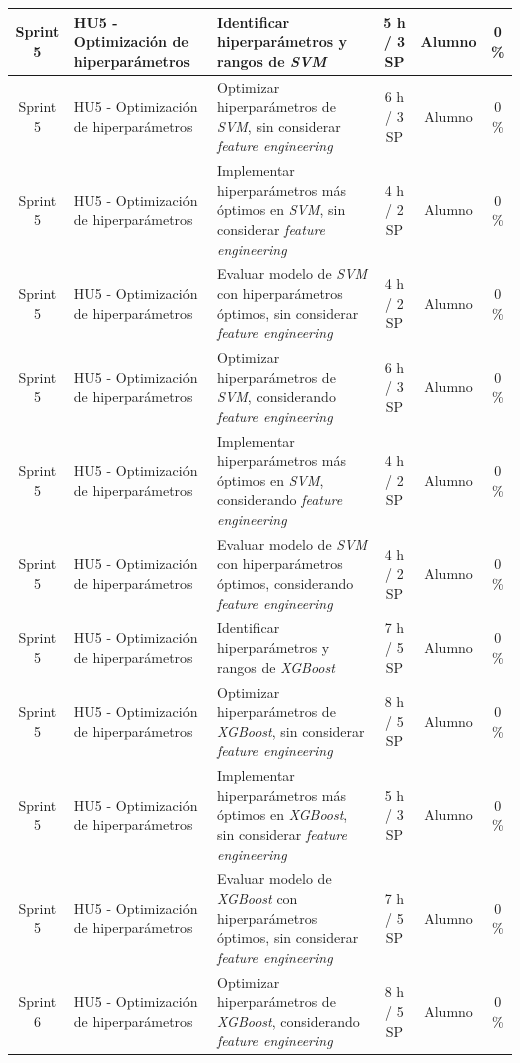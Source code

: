 \documentclass[
11pt, %
]{charter}
\begin{document}
\begin{xltabular}{\linewidth}{@{}|c|X|X|c|c|c|@{}}
Sprint 5 & HU5 - Optimización de hiperparámetros & Identificar hiperparámetros y rangos de \textit{SVM}  & 5 h / 3 SP & Alumno & 0 \% \\ \hline
Sprint 5 & HU5 - Optimización de hiperparámetros & Optimizar hiperparámetros de \textit{SVM}, sin considerar \textit{feature engineering}  & 6 h / 3 SP & Alumno & 0 \% \\ \hline
Sprint 5 & HU5 - Optimización de hiperparámetros & Implementar hiperparámetros más óptimos en \textit{SVM}, sin considerar \textit{feature engineering}  & 4 h / 2 SP & Alumno & 0 \% \\ \hline
Sprint 5 & HU5 - Optimización de hiperparámetros & Evaluar modelo de \textit{SVM} con hiperparámetros óptimos, sin considerar \textit{feature engineering}  & 4 h / 2 SP & Alumno & 0 \% \\ \hline
Sprint 5 & HU5 - Optimización de hiperparámetros & Optimizar hiperparámetros de \textit{SVM}, considerando \textit{feature engineering}  & 6 h / 3 SP & Alumno & 0 \% \\ \hline
Sprint 5 & HU5 - Optimización de hiperparámetros & Implementar hiperparámetros más óptimos en \textit{SVM}, considerando \textit{feature engineering}  & 4 h / 2 SP & Alumno & 0 \% \\ \hline
Sprint 5 & HU5 - Optimización de hiperparámetros & Evaluar modelo de \textit{SVM} con hiperparámetros óptimos, considerando \textit{feature engineering}  & 4 h / 2 SP & Alumno & 0 \% \\ \hline
Sprint 5 & HU5 - Optimización de hiperparámetros & Identificar hiperparámetros y rangos de \textit{XGBoost}  & 7 h / 5 SP & Alumno & 0 \% \\ \hline
Sprint 5 & HU5 - Optimización de hiperparámetros & Optimizar hiperparámetros de \textit{XGBoost}, sin considerar \textit{feature engineering}  & 8 h / 5 SP & Alumno & 0 \%\\ \hline
Sprint 5 & HU5 - Optimización de hiperparámetros & Implementar hiperparámetros más óptimos en \textit{XGBoost}, sin considerar \textit{feature engineering} & 5 h / 3 SP & Alumno & 0 \% \\ \hline
Sprint 5 & HU5 - Optimización de hiperparámetros & Evaluar modelo de \textit{XGBoost} con hiperparámetros óptimos, sin considerar \textit{feature engineering}  & 7 h / 5 SP & Alumno & 0 \% \\ \hline
Sprint 6 & HU5 - Optimización de hiperparámetros & Optimizar hiperparámetros de \textit{XGBoost}, considerando \textit{feature engineering}  & 8 h / 5 SP & Alumno & 0 \%\\ \hline

\end{xltabular}
\end{document}
